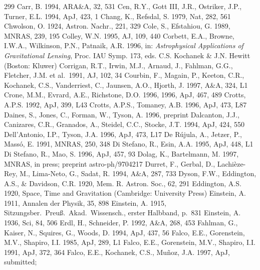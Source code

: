 \documentclass[a4paper,10pt]{article} %
\begin{document}
\begin{thebibliography}{299}
  Carr, B. 1994, ARA\&A, 32, 531
  Cen, R.Y., Gott III, J.R., Ostriker, J.P., Turner, E.L. 1994, ApJ,
  423, 1
  Chang, K., Refsdal, S. 1979, Nat, 282, 561
  Chwolson, O. 1924, Astron. Nachr., 221, 329
  Cole, S., Efstahiou, G. 1989, MNRAS, 239, 195
  Colley, W.N. 1995, AJ, 109, 440
  Corbett, E.A., Browne, I.W.A., Wilkinson, P.N., Patnaik, A.R. 1996,
  in: {\em Astrophysical Applications of Gravitational Lensing\/},
  Proc. IAU Symp. 173, eds. C.S. Kochanek \& J.N. Hewitt (Boston:
  Kluwer)
  Corrigan, R.T., Irwin, M.J., Arnaud, J., Fahlman, G.G., Fletcher,
  J.M. et al.\ 1991, AJ, 102, 34
  Courbin, F., Magain, P., Keeton, C.R., Kochanek, C.S., Vanderriest,
  C., Jaunsen, A.O., Hjorth, J. 1997, A\&A, 324, L1
  Crone, M.M., Evrard, A.E., Richstone, D.O. 1996, 1996, ApJ, 467, 489
  Crotts, A.P.S. 1992, ApJ, 399, L43
  Crotts, A.P.S., Tomaney, A.B. 1996, ApJ, 473, L87
  Daines, S., Jones, C., Forman, W., Tyson, A. 1996, preprint
  Dalcanton, J.J., Canizares, C.R., Granados, A., Steidel, C.C.,
  Stocke, J.T. 1994, ApJ, 424, 550
  Dell'Antonio, I.P., Tyson, J.A. 1996, ApJ, 473, L17
  De R\'ujula, A., Jetzer, P., Mass\'o, E. 1991, MNRAS, 250, 348
  Di Stefano, R., Esin, A.A. 1995, ApJ, 448, L1
  Di Stefano, R., Mao, S. 1996, ApJ, 457, 93
  Dolag, K., Bartelmann, M. 1997, MNRAS, in press; preprint
  astro-ph/9704217
  Durret, F., Gerbal, D., Lachi\`eze-Rey, M., Lima-Neto, G., Sadat,
  R. 1994, A\&A, 287, 733
  Dyson, F.W., Eddington, A.S., \& Davidson, C.R. 1920,
  Mem. R. Astron. Soc., 62, 291
  Eddington, A.S. 1920, Space, Time and Gravitation (Cambridge:
  University Press)
  Einstein, A. 1911, Annalen der Physik, 35, 898
  Einstein, A. 1915, Sitzungsber.\ Preu{\ss}.\ Akad.\ Wissensch., erster
  Halbband, p.\ 831
  Einstein, A. 1936, Sci, 84, 506
  Erdl, H., Schneider, P. 1992, A\&A, 268, 453
  Fahlman, G., Kaiser, N., Squires, G., Woods, D. 1994, ApJ, 437, 56
  Falco, E.E., Gorenstein, M.V., Shapiro, I.I. 1985, ApJ, 289, L1
  Falco, E.E., Gorenstein, M.V., Shapiro, I.I. 1991, ApJ, 372, 364
  Falco, E.E., Kochanek, C.S., Mu\~noz, J.A. 1997, ApJ, submitted;

\end{thebibliography}
\end{document}
